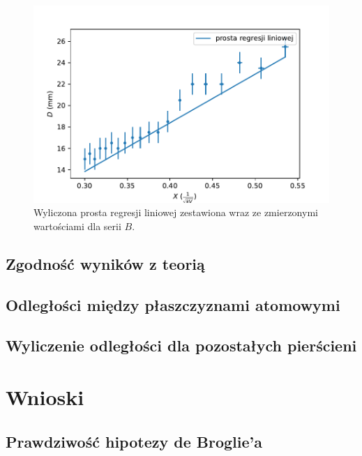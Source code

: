 \documentclass[a4paper]{article}
\begin{document}
\begin{figure}[h]
\centering
\includegraphics[scale=0.7]{wykres_B.pdf}
\caption{Wyliczona prosta regresji liniowej zestawiona wraz ze zmierzonymi wartościami dla serii $B$.}
\label{wykres_B}
\end{figure}

\subsection{Zgodność wyników z teorią}

\subsection{Odległości między płaszczyznami atomowymi}

\subsection{Wyliczenie odległości dla pozostałych pierścieni}

\section{Wnioski}

\subsection{Prawdziwość hipotezy de Broglie'a}
\end{document}
